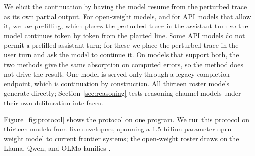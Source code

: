 We elicit the continuation by having the model resume from the perturbed trace as its own partial output. For open-weight models, and for API models that allow it, we use prefilling, which places the perturbed trace in the assistant turn so the model continues token by token from the planted line. Some API models do not permit a prefilled assistant turn; for these we place the perturbed trace in the user turn and ask the model to continue it. On models that support both, the two methods give the same absorption on computed errors, so the method does not drive the result. One model is served only through a legacy completion endpoint, which is continuation by construction. All thirteen roster models generate directly; Section~\ref{sec:reasoning} tests reasoning-channel models under their own deliberation interfaces.

Figure~\ref{fig:protocol} shows the protocol on one program. We run this protocol on thirteen models from five developers, spanning a 1.5-billion-parameter open-weight model to current frontier systems; the open-weight roster draws on the Llama, Qwen, and {OLMo} families \citep{llama3,qwen25,olmo2}.
